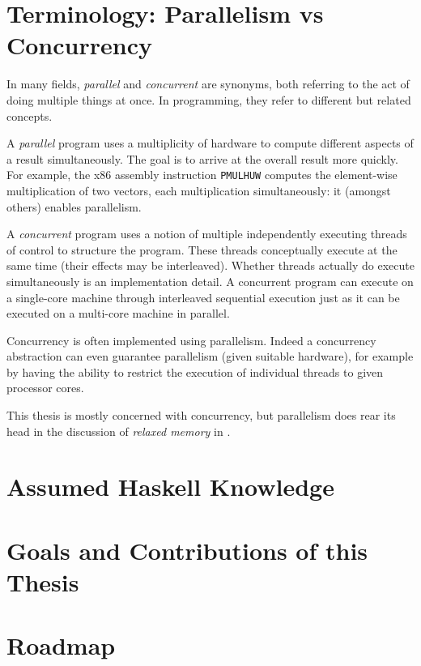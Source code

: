 \blindtext

\section{Terminology: Parallelism vs Concurrency}
\label{sec:intro-parconc}

In many fields, \emph{parallel} and \emph{concurrent} are synonyms, both
referring to the act of doing multiple things at once.  In programming, they
refer to different but related concepts.

A \emph{parallel} program uses a multiplicity of hardware to compute different
aspects of a result simultaneously.  The goal is to arrive at the overall result
more quickly.  For example, the x86 assembly instruction \verb#PMULHUW# computes
the element-wise multiplication of two vectors, each multiplication
simultaneously: it (amongst others) enables parallelism.

A \emph{concurrent} program uses a notion of multiple independently executing
threads of control to structure the program.  These threads conceptually execute
at the same time (their effects may be interleaved).  Whether threads actually
do execute simultaneously is an implementation detail.  A concurrent program can
execute on a single-core machine through interleaved sequential execution just
as it can be executed on a multi-core machine in parallel.

Concurrency is often implemented using parallelism.  Indeed a concurrency
abstraction can even guarantee parallelism (given suitable hardware), for
example by having the ability to restrict the execution of individual threads to
given processor cores.

This thesis is mostly concerned with concurrency, but parallelism does rear its
head in the discussion of \emph{relaxed memory} in .

\section{Assumed Haskell Knowledge}
\label{sec:intro-assumed}
\blindtext

\section{Goals and Contributions of this Thesis}
\label{sec:intro-contributions}
\blindtext

\section{Roadmap}
\label{sec:intro-roadmap}

